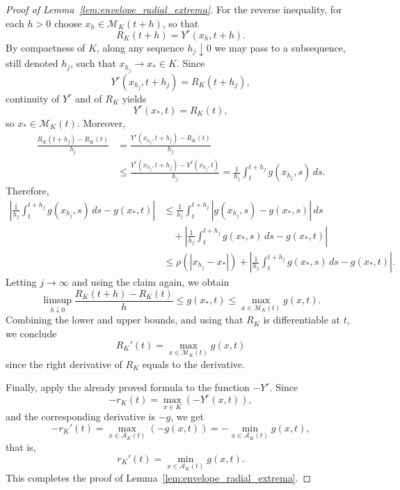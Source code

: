 \documentclass[reqno,11pt]{amsart}
\begin{document}
\begin{proof}[Proof of Lemma~\ref{lem:envelope_radial_extrema}]
For the reverse inequality, for each $h>0$ choose $x_h\in \mathcal M_K(t+h)$, so that
\[
R_K(t+h)=Y^r(x_h,t+h).
\]
By compactness of $K$, along any sequence $h_j\downarrow 0$ we may pass to a subsequence,
still denoted $h_j$, such that $x_{h_j}\to x_*\in K$. Since
\[
Y^r(x_{h_j},t+h_j)=R_K(t+h_j),
\]
continuity of $Y^r$ and of $R_K$ yields
\[
Y^r(x_*,t)=R_K(t),
\]
so $x_*\in \mathcal M_K(t)$. Moreover,
\begin{align*}
\frac{R_K(t+h_j)-R_K(t)}{h_j}
&=
\frac{Y^r(x_{h_j},t+h_j)-R_K(t)}{h_j}
\\
&\le
\frac{Y^r(x_{h_j},t+h_j)-Y^r(x_{h_j},t)}{h_j}
=
\frac{1}{h_j}\int_t^{t+h_j} g(x_{h_j},s)\,ds.
\end{align*}
Therefore,
\[
\begin{aligned}
\left|
\frac{1}{h_j}\int_t^{t+h_j} g(x_{h_j},s)\,ds - g(x_*,t)
\right|
&\le
\frac{1}{h_j}\int_t^{t+h_j}|g(x_{h_j},s)-g(x_*,s)|\,ds \\
&\quad +
\left|
\frac{1}{h_j}\int_t^{t+h_j} g(x_*,s)\,ds - g(x_*,t)
\right| \\
&\le
\rho(|x_{h_j}-x_*|) +
\left|
\frac{1}{h_j}\int_t^{t+h_j} g(x_*,s)\,ds - g(x_*,t)
\right|.
\end{aligned}
\]
Letting $j\to\infty$ and using the claim again, we obtain
\[
\limsup_{h\downarrow 0}\frac{R_K(t+h)-R_K(t)}{h}
\le g(x_*,t)
\le \max_{x\in \mathcal M_K(t)} g(x,t).
\]
Combining the lower and upper bounds, and using that $R_K$ is differentiable at $t$,
we conclude
\[
R_K'(t)=\max_{x\in \mathcal M_K(t)} g(x,t)
\]
since the right derivative of $R_K$ equals to the derivative.

Finally, apply the already proved formula to the function $-Y^r$. Since
\[
-r_K(t)=\max_{x\in K}(-Y^r(x,t)),
\]
and the corresponding derivative is $-g$, we get
\[
-r_K'(t)=\max_{x\in \mathcal A_K(t)}(-g(x,t))
= - \min_{x\in \mathcal A_K(t)} g(x,t),
\]
that is,
\[
r_K'(t)=\min_{x\in \mathcal A_K(t)} g(x,t).
\]
This completes the proof of Lemma~\ref{lem:envelope_radial_extrema}.
\end{proof}
\end{document}
